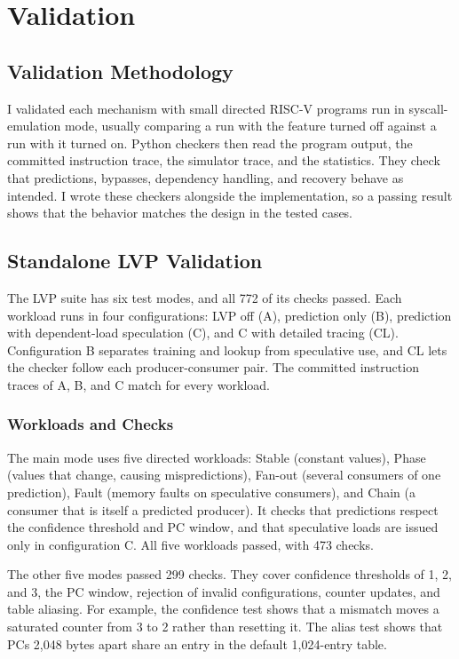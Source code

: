\section{Validation}

\subsection{Validation Methodology}

I validated each mechanism with small directed RISC-V programs run in
syscall-emulation mode, usually comparing a run with the feature
turned off against a run with it turned on. Python checkers then read
the program output, the committed instruction trace, the simulator
trace, and the statistics. They check that predictions, bypasses,
dependency handling, and recovery behave as intended. I wrote these
checkers alongside the implementation, so a passing result shows that
the behavior matches the design in the tested cases.

\subsection{Standalone LVP Validation}

The LVP suite has six test modes, and all 772 of its checks passed.
Each workload runs in four configurations: LVP off (A), prediction
only (B), prediction with dependent-load speculation (C), and C with
detailed tracing (CL). Configuration B separates training and lookup
from speculative use, and CL lets the checker follow each
producer-consumer pair. The committed instruction traces of A, B, and
C match for every workload.

\subsubsection{Workloads and Checks}

The main mode uses five directed workloads: Stable (constant values),
Phase (values that change, causing mispredictions), Fan-out (several
consumers of one prediction), Fault (memory faults on speculative
consumers), and Chain (a consumer that is itself a predicted
producer). It checks that predictions respect the confidence threshold
and PC window, and that speculative loads are issued only in
configuration C. All five workloads passed, with 473 checks.

The other five modes passed 299 checks. They cover confidence
thresholds of 1, 2, and 3, the PC window, rejection of invalid
configurations, counter updates, and table aliasing. For example, the
confidence test shows that a mismatch moves a saturated counter from
3 to 2 rather than resetting it. The alias test shows that PCs 2,048
bytes apart share an entry in the default 1,024-entry table.


